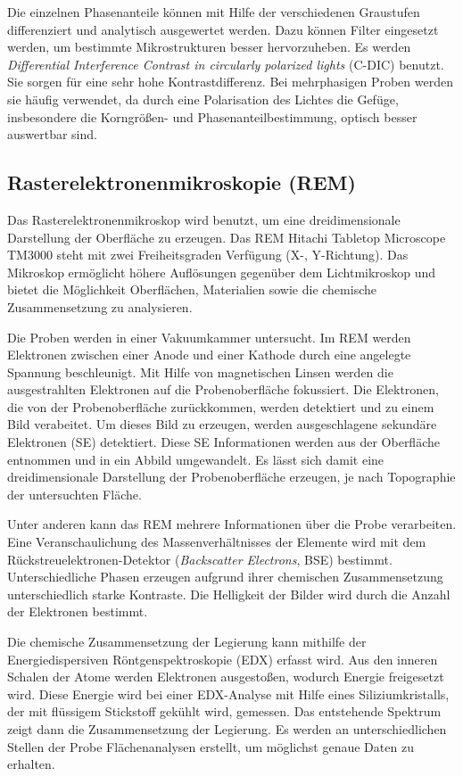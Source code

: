 Die einzelnen Phasenanteile können mit Hilfe der verschiedenen Graustufen differenziert und analytisch ausgewertet werden. Dazu können Filter eingesetzt werden, um bestimmte Mikrostrukturen besser hervorzuheben. Es werden \textit{Differential Interference Contrast in circularly polarized lights} (C-DIC) benutzt. Sie sorgen für eine sehr hohe Kontrastdifferenz. Bei mehrphasigen Proben werden sie häufig verwendet, da durch eine Polarisation des Lichtes die Gefüge, insbesondere die Korngrößen- und Phasenanteilbestimmung, optisch besser auswertbar sind.

\subsection*{Rasterelektronenmikroskopie (REM)}

Das Rasterelektronenmikroskop wird benutzt, um eine dreidimensionale Darstellung der Oberfläche zu erzeugen. Das REM Hitachi Tabletop Microscope TM3000 steht mit zwei Freiheitsgraden Verfügung (X-, Y-Richtung). Das Mikroskop ermöglicht höhere Auflösungen gegenüber dem Lichtmikroskop und bietet die Möglichkeit Oberflächen, Materialien sowie die chemische Zusammensetzung zu analysieren. 

Die Proben werden in einer Vakuumkammer untersucht. Im REM werden Elektronen zwischen einer Anode und einer Kathode durch eine angelegte Spannung beschleunigt. Mit Hilfe von magnetischen Linsen werden die ausgestrahlten Elektronen auf die Probenoberfläche fokussiert. 
Die Elektronen, die von der Probenoberfläche zurückkommen, werden detektiert und zu einem Bild verabeitet. 
Um dieses Bild zu erzeugen, werden ausgeschlagene sekundäre Elektronen (SE) detektiert. Diese SE Informationen werden aus der Oberfläche entnommen und in ein Abbild umgewandelt. 
Es lässt sich damit eine dreidimensionale Darstellung der Probenoberfläche erzeugen, je nach Topographie der untersuchten Fläche.

Unter anderen kann das REM mehrere Informationen über die Probe verarbeiten. Eine Veranschaulichung des Massenverhältnisses der Elemente wird mit dem Rückstreuelektronen-Detektor (\textit{Backscatter Electrons}, BSE) bestimmt. Unterschiedliche Phasen erzeugen aufgrund ihrer chemischen Zusammensetzung unterschiedlich starke Kontraste. Die Helligkeit der Bilder wird durch die Anzahl der Elektronen bestimmt.

Die chemische Zusammensetzung der Legierung kann mithilfe der Energiedispersiven Röntgenspektroskopie (EDX) erfasst wird. Aus den inneren Schalen der Atome werden Elektronen ausgestoßen, wodurch Energie freigesetzt wird. Diese Energie wird bei einer EDX-Analyse mit Hilfe eines Siliziumkristalls, der mit flüssigem Stickstoff gekühlt wird, gemessen. Das entstehende Spektrum zeigt dann die Zusammensetzung der Legierung. Es werden an unterschiedlichen Stellen der Probe Flächenanalysen erstellt, um möglichst genaue Daten zu erhalten.

